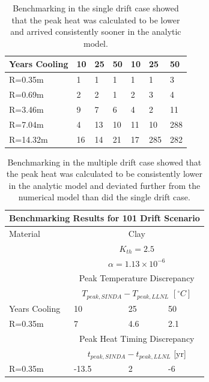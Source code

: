 \documentclass{anstrans}
\begin{document}
\begin{table}
{\begin{tabular}{|l|l|l|l|l|l|l|}
    Years Cooling  & 10     & 25      & 50      & 10     & 25     & 50\\
    \hline
     R=0.35m  & 1    & 1       & 1   & 1      & 1      & 3\\
     R=0.69m  & 2    & 2       & 1    & 2      & 3      & 4\\
     R=3.46m  & 9    & 7       & 6    & 4      & 2      & 11\\
     R=7.04m  & 4    & 13      & 10    & 11     & 10     & 288\\
     R=14.32m & 16   & 14      & 21   & 17     & 285    & 282\\
    \hline
  \end{tabular}
  \caption{Benchmarking in the single drift case showed that the peak heat was 
  calculated to be lower and arrived consistently sooner in the analytic model. 
  }
  \label{tab:benchSingle}
  }
\end{table}

\begin{table}
  \centering
  \footnotesize{
  \begin{tabular}{|l|l|l|l|}
    \multicolumn{4}{c}{\textbf{Benchmarking Results for 101 Drift Scenario}}\\
    \hline
    Material & \multicolumn{3}{|c|}{Clay} \\
    & \multicolumn{3}{|c|}{$K_{th}=2.5$}\\ 
    & \multicolumn{3}{|c|}{$\alpha=1.13\times10^{-6}$}  \\
    \hline
    & \multicolumn{3}{|c|}{Peak Temperature Discrepancy} \\
    & \multicolumn{3}{|c|}{$T_{peak,SINDA}-T_{peak,LLNL}$ $[^{\circ}C]$} \\
    \hline
    Years Cooling  & 10  & 25 & 50 \\
    \hline
    R=0.35m   & 7 & 4.6 & 2.1 \\
    \hline
    &\multicolumn{3}{|c|}{Peak Heat Timing Discrepancy}\\
    &\multicolumn{3}{|c|}{ $t_{peak,SINDA}-t_{peak,LLNL}$ [yr]} \\
    \hline
    R=0.35m       & -13.5   & 2   & -6  \\
    \hline
  \end{tabular}
  \caption{Benchmarking in the multiple drift case showed that the peak heat was 
  calculated to be consistently lower in the analytic model and deviated further
  from the numerical model than did the single drift case.
  }
  \label{tab:benchMulti}
  }
\end{table}
\end{document}
